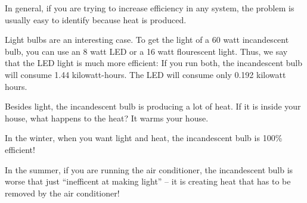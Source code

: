 In general, if you are trying to increase efficiency in any system,
the problem is usually easy to identify because heat is produced.

Light bulbs are an interesting case. To get the light of a 60 watt
incandescent bulb, you can use an 8 watt LED or a 16 watt flourescent
light. Thus, we say that the LED light is much more efficient: If you
run both, the incandescent bulb will consume 1.44 kilowatt-hours. The
LED will consume only 0.192 kilowatt hours.

Besides light, the incandescent bulb is producing a lot of heat. If it
is inside your house, what happens to the heat? It warms your house.

In the winter, when you want light and heat, the incandescent bulb is
100\% efficient!

In the summer, if you are running the air conditioner, the
incandescent bulb is worse that just ``inefficent at making light'' --
it is creating heat that has to be removed by the air conditioner! 
